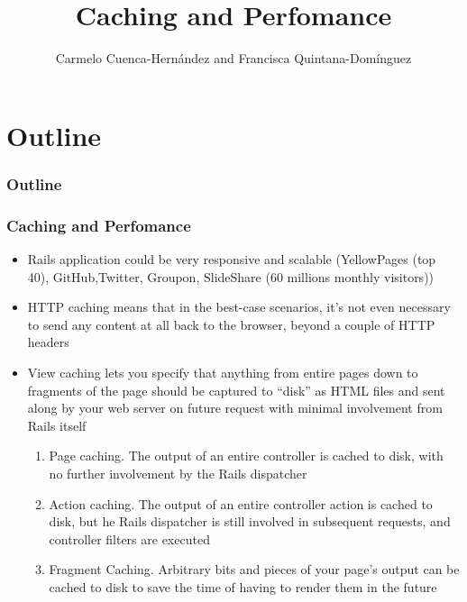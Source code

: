 \documentclass{beamer}
\title{Caching and Perfomance}
\author[C. Cuenca, F. Quintana]{Carmelo Cuenca-Hernández and Francisca Quintana-Domínguez}
\date{}
\begin{document}
\begin{frame}
	\titlepage
\end{frame}


\section*{Outline}
\begin{frame}
  \frametitle{Outline}
  \tableofcontents[currentsection,sectionstyle=show,hideothersubsections]
\end{frame}

%



\begin{frame}
\frametitle{Caching and Perfomance}
\begin{itemize}
\item Rails application could be very responsive and scalable (YellowPages (top 40), GitHub,Twitter, Groupon, SlideShare (60 millions monthly visitors))
\item HTTP caching means that in the best-case scenarios, it's not even necessary to send any content at all back to the browser, beyond a couple of HTTP headers

\item View caching lets you specify that anything from entire pages down to fragments of the page should be captured to ``disk'' as HTML files and sent along by your web server on future request with minimal involvement from Rails itself
\begin{enumerate}
\item Page caching. The output of an entire controller is cached to disk, with no further involvement by the Rails dispatcher
\item Action caching. The output of an entire controller action is cached to disk, but he Rails dispatcher is still involved in subsequent requests, and controller filters are executed
\item Fragment Caching. Arbitrary bits and pieces of your page’s output can be cached to disk
to save the time of having to render them in the future
\end{enumerate}

\end{itemize}

\end{frame}
\end{document}
